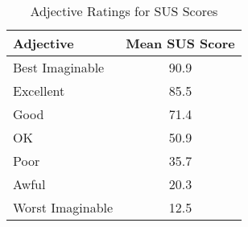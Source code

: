 \begin{table}[ht]
  \centering
  \begin{tabular}{lc}
    \toprule
    Adjective & Mean SUS Score\\
    \midrule
    Best Imaginable & 90.9\\
    Excellent & 85.5\\
    Good & 71.4\\
    OK & 50.9\\
    Poor & 35.7\\
    Awful & 20.3\\
    Worst Imaginable & 12.5\\
    \bottomrule
  \end{tabular}
  \caption{Adjective Ratings for SUS Scores}\label{fig:susadj}
\end{table}